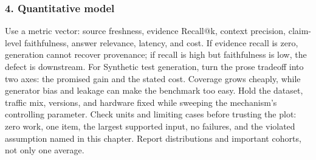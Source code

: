 \subsubsection*{4. Quantitative model}
Use a metric vector: source freshness, evidence Recall@k, context precision, claim-level faithfulness, answer relevance, latency, and cost. If evidence recall is zero, generation cannot recover provenance; if recall is high but faithfulness is low, the defect is downstream.
For Synthetic test generation, turn the prose tradeoff into two axes: the promised gain and the stated cost. Coverage grows cheaply, while generator bias and leakage can make the benchmark too easy. Hold the dataset, traffic mix, versions, and hardware fixed while sweeping the mechanism's controlling parameter.
Check units and limiting cases before trusting the plot: zero work, one item, the largest supported input, no failures, and the violated assumption named in this chapter. Report distributions and important cohorts, not only one average.
